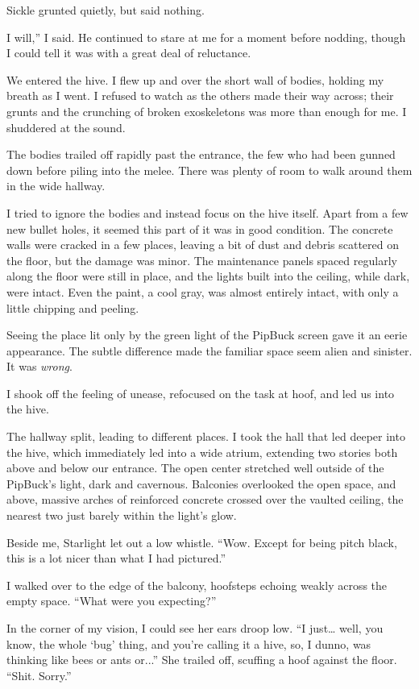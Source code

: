 Sickle grunted quietly, but said nothing.

\leavevmode{}I will,” I said. He continued to stare at me for a moment before nodding, though I could tell it was with a great deal of reluctance.

We entered the hive. I flew up and over the short wall of bodies, holding my breath as I went. I refused to watch as the others made their way across; their grunts and the crunching of broken exoskeletons was more than enough for me. I shuddered at the sound.

The bodies trailed off rapidly past the entrance, the few who had been gunned down before piling into the melee. There was plenty of room to walk around them in the wide hallway.

I tried to ignore the bodies and instead focus on the hive itself. Apart from a few new bullet holes, it seemed this part of it was in good condition. The concrete walls were cracked in a few places, leaving a bit of dust and debris scattered on the floor, but the damage was minor. The maintenance panels spaced regularly along the floor were still in place, and the lights built into the ceiling, while dark, were intact. Even the paint, a cool gray, was almost entirely intact, with only a little chipping and peeling.

Seeing the place lit only by the green light of the PipBuck screen gave it an eerie appearance. The subtle difference made the familiar space seem alien and sinister. It was \textit{wrong}.

I shook off the feeling of unease, refocused on the task at hoof, and led us into the hive.

The hallway split, leading to different places. I took the hall that led deeper into the hive, which immediately led into a wide atrium, extending two stories both above and below our entrance. The open center stretched well outside of the PipBuck’s light, dark and cavernous. Balconies overlooked the open space, and above, massive arches of reinforced concrete crossed over the vaulted ceiling, the nearest two just barely within the light’s glow.

Beside me, Starlight let out a low whistle. “Wow. Except for being pitch black, this is a lot nicer than what I had pictured.”

I walked over to the edge of the balcony, hoofsteps echoing weakly across the empty space. “What were you expecting?”

In the corner of my vision, I could see her ears droop low. “I just… well, you know, the whole ‘bug’ thing, and you’re calling it a hive, so, I dunno, was thinking like bees or ants or...” She trailed off, scuffing a hoof against the floor. “Shit. Sorry.”

